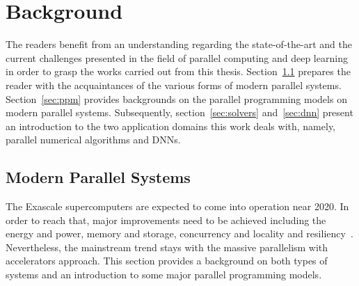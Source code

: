 \chapter{Background}
\label{chap:background}
The readers benefit from an understanding regarding the state-of-the-art and the 
current challenges presented in the field of parallel computing and deep 
learning in order to grasp the works carried out from this thesis.
Section~\ref{sec:mps} prepares the reader with the acquaintances of the various 
forms of modern parallel systems. Section~\ref{sec:ppm} provides backgrounds on 
the parallel programming models on modern parallel systems. Subsequently, 
section~\ref{sec:solvers} and~\ref{sec:dnn} present an introduction to the two 
application domains this work deals with, namely, parallel numerical algorithms 
and DNNs.

\section{Modern Parallel Systems}
\label{sec:mps}
The Exascale supercomputers are expected to come into operation near 2020. In 
order to reach that, major improvements need to be achieved including the energy 
and power, memory and storage, concurrency and locality and 
resiliency~\cite{doe}. Nevertheless, the mainstream trend stays with the massive 
parallelism with accelerators approach. This section provides a background on 
both types of systems and an introduction to some major parallel programming 
models.


